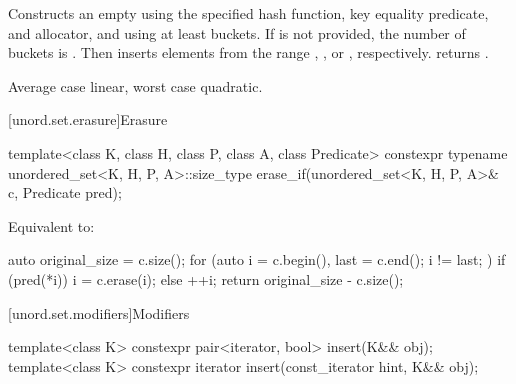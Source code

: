 \begin{itemdescr}
\pnum
\effects
Constructs an empty  using the
specified hash function, key equality predicate, and allocator, and
using at least  buckets. If  is not
provided, the number of buckets is . Then
inserts elements from the range , , or ,
respectively.
 returns .

\pnum
\complexity
Average case linear, worst case quadratic.
\end{itemdescr}

[unord.set.erasure]{Erasure}

%
\begin{itemdecl}
template<class K, class H, class P, class A, class Predicate>
  constexpr typename unordered_set<K, H, P, A>::size_type
    erase_if(unordered_set<K, H, P, A>& c, Predicate pred);
\end{itemdecl}

\begin{itemdescr}
\pnum
\effects
Equivalent to:
\begin{codeblock}
auto original_size = c.size();
for (auto i = c.begin(), last = c.end(); i != last; ) {
  if (pred(*i)) {
    i = c.erase(i);
  } else {
    ++i;
  }
}
return original_size - c.size();
\end{codeblock}
\end{itemdescr}

[unord.set.modifiers]{Modifiers}

%
\begin{itemdecl}
template<class K> constexpr pair<iterator, bool> insert(K&& obj);
template<class K> constexpr iterator insert(const_iterator hint, K&& obj);
\end{itemdecl}


